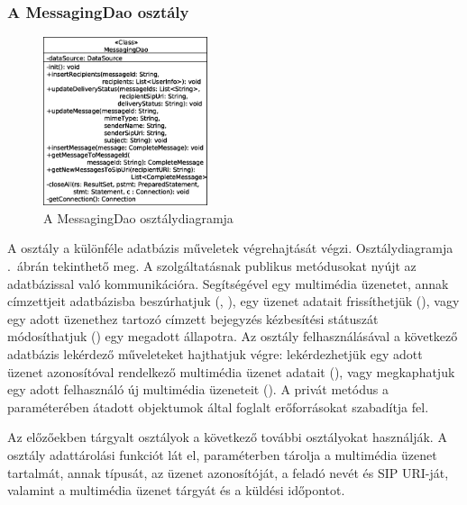 \subsubsection*{A MessagingDao osztály}
\label{sec:server_messagingdao}

\begin{figure}
  \vspace{-15pt}
  \begin{center}
    \includegraphics[width=0.43\textwidth]{img/class_diagrams/server/eps/MessagingDao.eps}
  \end{center}
  \vspace{-15pt}
  \captionsetup{font=scriptsize}
  \caption{A MessagingDao osztálydiagramja}
   \label{fig:class_server_messagingdao}
  \vspace{-10pt}
\end{figure}

A  osztály a különféle adatbázis műveletek végrehajtását végzi. Osztálydiagramja .~ábrán tekinthető meg. A szolgáltatásnak publikus metódusokat nyújt az adatbázissal való kommunikációra. Segítségével egy multimédia üzenetet, annak címzettjeit adatbázisba beszúrhatjuk (, ), egy üzenet adatait frissíthetjük (), vagy egy adott üzenethez tartozó címzett bejegyzés kézbesítési státuszát módosíthatjuk () egy megadott állapotra. Az osztály felhasználásával a következő adatbázis lekérdező műveleteket hajthatjuk végre: lekérdezhetjük egy adott üzenet azonosítóval rendelkező multimédia üzenet adatait (), vagy megkaphatjuk egy adott felhasználó új multimédia üzeneteit (). A  privát metódus a paraméterében átadott objektumok által foglalt erőforrásokat szabadítja fel.

\medskip

Az előzőekben tárgyalt osztályok a következő további osztályokat használják. A  osztály adattárolási funkciót lát el, paraméterben tárolja a multimédia üzenet tartalmát, annak típusát, az üzenet azonosítóját, a feladó nevét és SIP URI-ját, valamint a multimédia üzenet tárgyát és a küldési időpontot.

